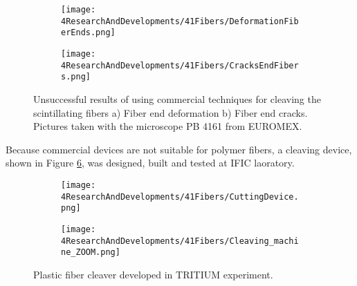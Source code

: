\begin{figure}
\centering
    \begin{subfigure}[b]{0.5\textwidth}
    \centering
    \texttt{[image: 4ResearchAndDevelopments/41Fibers/DeformationFiberEnds.png]}  
    \caption{\label{subfig:FiberEndDeformation}}
    \end{subfigure}
    \hfill
    \begin{subfigure}[b]{0.45\textwidth}
    \centering
    \texttt{[image: 4ResearchAndDevelopments/41Fibers/CracksEndFibers.png]}  
    \caption{\label{subfig:FiberEndCracks}}
    \end{subfigure}
 \caption{Unsuccessful results of using commercial techniques for cleaving the scintillating fibers a) Fiber end deformation b) Fiber end cracks. Pictures taken with the microscope PB 4161 from EUROMEX.}
 \label{fig:BadCleavesOfFibers}
\end{figure}

Because commercial devices are not suitable for polymer fibers, a cleaving device, shown in Figure \ref{fig:CleaveTRITIUMDevice}, was designed, built and tested at IFIC laoratory.

\begin{figure}
\centering
    \begin{subfigure}[b]{0.5\textwidth}
    \centering
    \texttt{[image: 4ResearchAndDevelopments/41Fibers/CuttingDevice.png]}  
    \caption{\label{subfig:CleaveTRITIUMDevice1}}
    \end{subfigure}
    \hfill
    \begin{subfigure}[b]{0.45\textwidth}
    \centering
    \texttt{[image: 4ResearchAndDevelopments/41Fibers/Cleaving\_machine\_ZOOM.png]}  
    \caption{\label{subfig:CleaveTRITIUMDeviceZOOM}}
    \end{subfigure}
 \caption{Plastic fiber cleaver developed in TRITIUM experiment. \label{fig:CleaveTRITIUMDevice}}
\end{figure}


